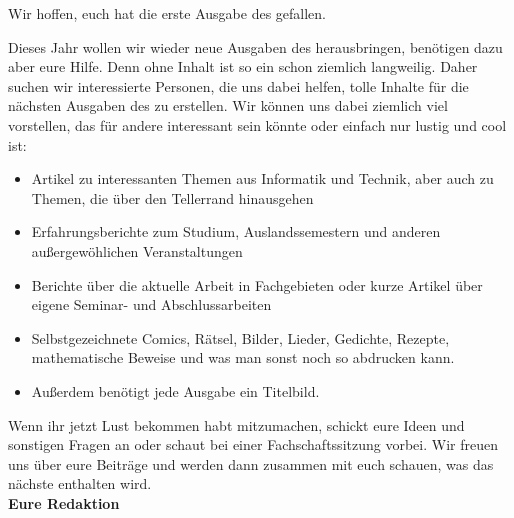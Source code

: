 Wir hoffen, euch hat die erste Ausgabe des \nameit \space gefallen.

Dieses Jahr wollen wir wieder neue Ausgaben des \nameit \space herausbringen, benötigen dazu aber eure Hilfe. Denn ohne Inhalt ist so ein \nameit \space schon ziemlich langweilig. Daher suchen wir interessierte Personen, die uns dabei helfen, tolle Inhalte für die nächsten Ausgaben des \nameit \space zu erstellen. Wir können uns dabei ziemlich viel vorstellen, das für andere interessant sein könnte oder einfach nur lustig und cool ist:

\begin{itemize}
	\item Artikel zu interessanten Themen aus Informatik und Technik, aber auch zu Themen, die über den Tellerrand hinausgehen
	\item Erfahrungsberichte zum Studium, Auslandssemestern und anderen außergewöhlichen Veranstaltungen
	\item Berichte über die aktuelle Arbeit in Fachgebieten oder kurze Artikel über eigene Seminar- und Abschlussarbeiten
	\item Selbstgezeichnete Comics, Rätsel, Bilder, Lieder, Gedichte, Rezepte, mathematische Beweise und was man sonst noch so abdrucken kann.
	\item Außerdem benötigt jede Ausgabe ein Titelbild.
\end{itemize}

Wenn ihr jetzt Lust bekommen habt mitzumachen, schickt eure Ideen und sonstigen Fragen an  oder schaut bei einer Fachschaftssitzung vorbei. Wir freuen uns über eure Beiträge und werden dann zusammen mit euch schauen, was das nächste \nameit \space enthalten wird.\\

\large
\textbf{Eure \name \space Redaktion}
\normalsize